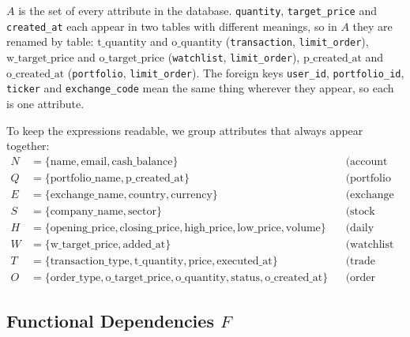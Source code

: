 \documentclass{article}
\newcommand{\at}[1]{\text{#1}}
\begin{document}
$A$ is the set of every attribute in the database. \texttt{quantity}, \texttt{target\_price} and \texttt{created\_at} each appear in two tables with different meanings, so in $A$ they are renamed by table: $\at{t\_quantity}$ and $\at{o\_quantity}$ (\texttt{transaction}, \texttt{limit\_order}), $\at{w\_target\_price}$ and $\at{o\_target\_price}$ (\texttt{watchlist}, \texttt{limit\_order}), $\at{p\_created\_at}$ and $\at{o\_created\_at}$ (\texttt{portfolio}, \texttt{limit\_order}). The foreign keys \texttt{user\_id}, \texttt{portfolio\_id}, \texttt{ticker} and \texttt{exchange\_code} mean the same thing wherever they appear, so each is one attribute.

To keep the expressions readable, we group attributes that always appear together:
\begin{align*}
  N &= \{\at{name}, \at{email}, \at{cash\_balance}\} && \text{(account details)} \\
  Q &= \{\at{portfolio\_name}, \at{p\_created\_at}\} && \text{(portfolio details)} \\
  E &= \{\at{exchange\_name}, \at{country}, \at{currency}\} && \text{(exchange details)} \\
  S &= \{\at{company\_name}, \at{sector}\} && \text{(stock details)} \\
  H &= \{\at{opening\_price}, \at{closing\_price}, \at{high\_price}, \at{low\_price}, \at{volume}\} && \text{(daily price details)} \\
  W &= \{\at{w\_target\_price}, \at{added\_at}\} && \text{(watchlist details)} \\
  T &= \{\at{transaction\_type}, \at{t\_quantity}, \at{price}, \at{executed\_at}\} && \text{(trade details)} \\
  O &= \{\at{order\_type}, \at{o\_target\_price}, \at{o\_quantity}, \at{status}, \at{o\_created\_at}\} && \text{(order details)}
\end{align*}

\subsection*{Functional Dependencies $F$}
\end{document}
